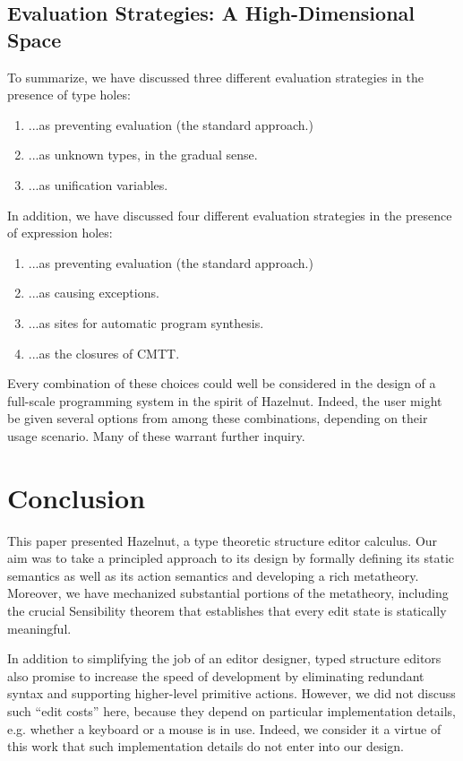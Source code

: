 \documentclass[9pt]{sigplanconf}
\begin{document}
\subsection{Evaluation Strategies: A High-Dimensional Space}
To summarize, we have discussed three different evaluation strategies in
the presence of type holes:
\begin{enumerate}[noitemsep]
\item ...as preventing evaluation (the standard approach.)
\item ...as unknown types, in the gradual sense.
\item ...as unification variables.
\end{enumerate}
In addition, we have discussed four different evaluation strategies in the
presence of expression holes:
\begin{enumerate}[noitemsep]
\item ...as preventing evaluation (the standard approach.)
\item ...as causing exceptions.
\item ...as sites for automatic program synthesis.
\item ...as the closures of CMTT.
\end{enumerate}

Every combination of these choices could well be considered in the design
of a full-scale programming system in the spirit of Hazelnut. Indeed, the
user might be given several options from among these combinations,
depending on their usage scenario. Many of these warrant further inquiry.

\section{Conclusion}
\label{sec:future}
This paper presented Hazelnut, a type theoretic structure editor
calculus. Our aim was to take a principled approach to its design by
formally defining its static semantics as well as its action semantics and
developing a rich metatheory. Moreover, we have mechanized substantial
portions of the metatheory, including the crucial Sensibility theorem that
establishes that every edit state is statically meaningful.

In addition to simplifying the job of an editor designer, typed structure
editors also promise to increase the speed of development by eliminating
redundant syntax and supporting higher-level primitive actions. However, we
did not discuss such ``edit costs'' here, because they depend on particular
implementation details, e.g. whether a keyboard or a mouse is in
use. Indeed, we consider it a virtue of this work that such implementation
details do not enter into our design.
\end{document}
